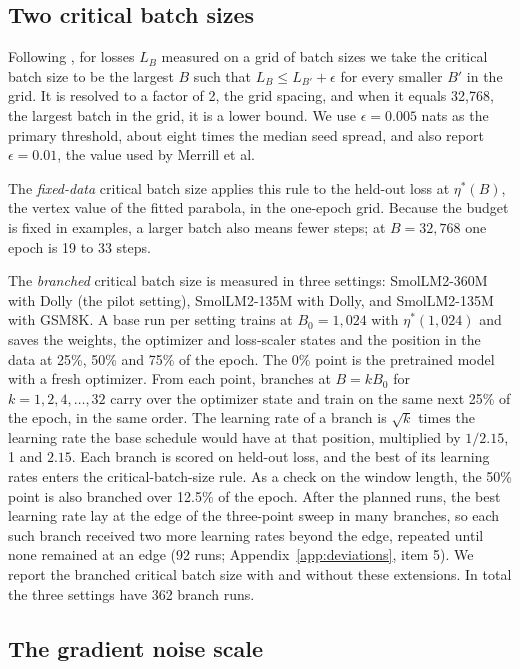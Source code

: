 \documentclass[10pt]{article}
\begin{document}
\subsection{Two critical batch sizes}\label{sec:cbs}

Following \citet{merrill2025}, for losses $L_B$ measured on a grid of batch sizes we take the critical batch size to be the largest $B$ such that $L_B \le L_{B'} + \epsilon$ for every smaller $B'$ in the grid. It is resolved to a factor of 2, the grid spacing, and when it equals 32,768, the largest batch in the grid, it is a lower bound. We use $\epsilon = 0.005$ nats as the primary threshold, about eight times the median seed spread, and also report $\epsilon = 0.01$, the value used by Merrill et al.

The \emph{fixed-data} critical batch size applies this rule to the held-out loss at $\eta^*(B)$, the vertex value of the fitted parabola, in the one-epoch grid. Because the budget is fixed in examples, a larger batch also means fewer steps; at $B = 32{,}768$ one epoch is 19 to 33 steps.

The \emph{branched} critical batch size is measured in three settings: SmolLM2-360M with Dolly (the pilot setting), SmolLM2-135M with Dolly, and SmolLM2-135M with GSM8K. A base run per setting trains at $B_0 = 1{,}024$ with $\eta^*(1{,}024)$ and saves the weights, the optimizer and loss-scaler states and the position in the data at 25\%, 50\% and 75\% of the epoch. The 0\% point is the pretrained model with a fresh optimizer. From each point, branches at $B = kB_0$ for $k = 1, 2, 4, \ldots, 32$ carry over the optimizer state and train on the same next 25\% of the epoch, in the same order. The learning rate of a branch is $\sqrt{k}$ times the learning rate the base schedule would have at that position, multiplied by $1/2.15$, 1 and $2.15$. Each branch is scored on held-out loss, and the best of its learning rates enters the critical-batch-size rule. As a check on the window length, the 50\% point is also branched over 12.5\% of the epoch. After the planned runs, the best learning rate lay at the edge of the three-point sweep in many branches, so each such branch received two more learning rates beyond the edge, repeated until none remained at an edge (92 runs; Appendix~\ref{app:deviations}, item 5). We report the branched critical batch size with and without these extensions. In total the three settings have 362 branch runs.

\subsection{The gradient noise scale}\label{sec:noise}
\end{document}
